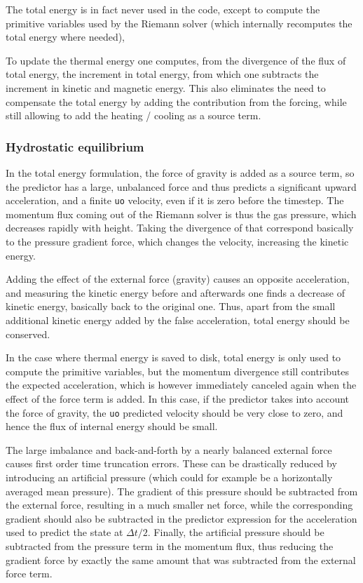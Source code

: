 \documentclass[paper=a4,fontsize=11pt]{scrartcl}
\numberwithin{equation}{section}		%
\numberwithin{figure}{section}			%
\numberwithin{table}{section}				%
\newcommand{\codecolor}{\color{Blue}}
\newcommand{\Code}[1]{{\codecolor\texttt{#1}}}
\begin{document}
The total energy is in fact never used in the code, except to compute the primitive variables used by the Riemann solver (which internally recomputes the total energy where needed),

To update the thermal energy one computes, from the divergence of the flux of total energy, the increment in total energy, from which one subtracts the increment in kinetic and magnetic energy.  This also eliminates the need to compensate the total energy by adding the contribution from the forcing, while still allowing to add the heating / cooling as a source term.

\subsubsection{Hydrostatic equilibrium}
In the total energy formulation, the force of gravity is added as a source term, so the predictor has a large, unbalanced force and thus predicts a significant upward acceleration, and a finite \Code{uo} velocity, even if it is zero before the timestep.  The momentum flux coming out of the Riemann solver is thus the gas pressure, which decreases rapidly with height.  Taking the divergence of that correspond basically to the pressure gradient force, which changes the velocity, increasing the kinetic energy.

Adding the effect of the external force (gravity) causes an opposite acceleration, and measuring the kinetic energy before and afterwards one finds a decrease of kinetic energy, basically back to the original one. Thus, apart from the small additional kinetic energy added by the false acceleration, total energy should be conserved.

In the case where thermal energy is saved to disk, total energy is only used to compute the primitive variables, but the momentum divergence still contributes the expected acceleration, which is however immediately canceled again when the effect of the force term is added.  In this case, if the predictor takes into account the force of gravity, the \Code{uo} predicted velocity should be very close to zero, and hence the flux of internal energy should be small.

The large imbalance and back-and-forth by a nearly balanced external force causes first order time truncation errors.  These can be drastically reduced by introducing an artificial pressure (which could for example be a horizontally averaged mean pressure).  The gradient of this pressure should be subtracted from the external force, resulting in a much smaller net force, while the corresponding gradient should also be subtracted in the predictor expression for the acceleration used to predict the state at $\Delta t/2$.  Finally, the artificial pressure should be subtracted from the pressure term in the momentum flux, thus reducing the gradient force by exactly the same amount that was subtracted from the external force term.
\end{document}
